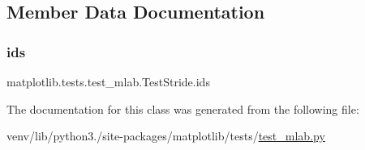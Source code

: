 \subsection{Member Data Documentation}
\mbox{\label{classmatplotlib_1_1tests_1_1test__mlab_1_1TestStride_a7d1d0e534aa485593a66b09b238d0e37}} 
\subsubsection{\texorpdfstring{ids}{ids}}
{\footnotesize\ttfamily matplotlib.\+tests.\+test\+\_\+mlab.\+Test\+Stride.\+ids\hspace{0.3cm}{\ttfamily [static]}}



The documentation for this class was generated from the following file\+:\begin{DoxyCompactItemize}
\item 
venv/lib/python3./site-\/packages/matplotlib/tests/\hyperlink{test__mlab_8py}{test\+\_\+mlab.\+py}\end{DoxyCompactItemize}

